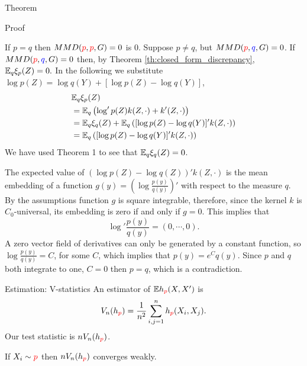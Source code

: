 \begin{frame}
\begin{columns}
\begin{column}{.33\linewidth}
\begin{block}{Theorem}
\end{block}

\vspace{-0.75cm}
\begin{block}{Proof}

 If $p=q$ then $MMD({\color{red} p},{ \color{red} p},G) =0$ is $0$. Suppose
$p\neq q$, but $MMD({\color{red} p},{ \color{blue} q},G) =0$. If $MMD({\color{red} p},{ \color{blue} q},G) =0$ then, by Theorem \ref{th:closed_form_discrepancy},
$\mathbb{E}_{q}\xi_{p}(Z)=0.$ In the following we substitute $\log p(Z)=\log q(Y)+[\log p(Z)-\log q(Y)]$,
\begin{align*}
 & \mathbb{E}_{q}\xi_{p}(Z)\\
 & =\mathbb{E}_{q}\left( \log' p(Z)k(Z,\cdot)+ k'(Z,\cdot)\right)\\
 & =\mathbb{E}_{q}\xi_{q}(Z)+\mathbb{E}_{q}\left([\log p(Z)-\log q(Y)]'k(Z,\cdot)\right)\\
 & =\mathbb{E}_{q}\left( [\log p(Z)-\log q(Y)]' k(Z,\cdot)\right)
\end{align*}
We have used Theorem 1 to see that $\mathbb{E}_{q}\xi_{q}(Z)=0$. 

The expected value of $(\log p(Z)-\log q(Z))' k(Z,\cdot)$ is the mean embedding of
a function $g(y)=\left(\log\frac{p(y)}{q(y)}\right)'$ with respect
to the measure $q$. By the assumptions function $g$ is square integrable,
therefore, since the kernel $k$ is $C_0$-universal, %
its embedding is zero if and only if $g=0$. This implies that 
\[
\log'\frac{p(y)}{q(y)}=(0,\cdots,0).
\]
A zero vector field of derivatives can only be generated by a
constant function, so $\log\frac{p(y)}{q(y)}=C$, for some $C$, which
implies that $p(y)=e^{C}q(y)$. Since $p$ and $q$ both integrate
to one, $C=0$ then $p=q$, which is a contradiction.
\end{block}


\vspace{-0.75cm}
\begin{block}{Estimation: V-statistics}
An estimator of $\mathbb{E} h_{\color{red} p}(X,X')$ is
\begin{align*}
 V_n(h_{\color{red} p}) = \frac {1} {n^2} \sum_{i,j=1}^n h_{\color{red} p}(X_i,X_j).
\end{align*}
Our test statistic is $ n V_n(h_{\color{red} p})$.

If $X_i \sim {\color{red} p}$ then $ n V_n(h_{\color{red} p})$  converges weakly. 


\end{block}
\end{column}
\end{columns}
\end{frame}
